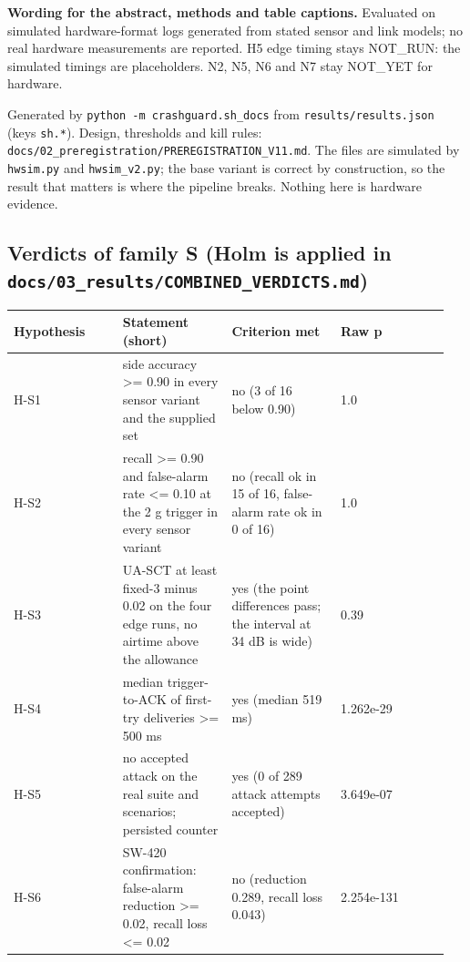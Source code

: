


\textbf{Wording for the abstract, methods and table captions.} Evaluated on simulated hardware-format logs generated from stated sensor and link models; no real hardware measurements are reported. H5 edge timing stays NOT\_RUN: the simulated timings are placeholders. N2, N5, N6 and N7 stay NOT\_YET for hardware.

Generated by \texttt{python -m crashguard.sh\_docs} from \texttt{results/results.json} (keys \texttt{sh.*}). Design, thresholds and kill rules: \texttt{docs/02\_preregistration/PREREGISTRATION\_V11.md}. The files are simulated by \texttt{hwsim.py} and \texttt{hwsim\_v2.py}; the base variant is correct by construction, so the result that matters is where the pipeline breaks. Nothing here is hardware evidence.

\subsection*{Verdicts of family S (Holm is applied in \texttt{docs/03\_results/COMBINED\_VERDICTS.md})}

{\scriptsize\raggedright
\begin{longtable}{p{0.237\linewidth}p{0.237\linewidth}p{0.237\linewidth}p{0.237\linewidth}}
\toprule
Hypothesis & Statement (short) & Criterion met & Raw p \\
\midrule
\endhead
H-S1 & side accuracy >= 0.90 in every sensor variant and the supplied set & no (3 of 16 below 0.90) & 1.0 \\
H-S2 & recall >= 0.90 and false-alarm rate <= 0.10 at the 2 g trigger in every sensor variant & no (recall ok in 15 of 16, false-alarm rate ok in 0 of 16) & 1.0 \\
H-S3 & UA-SCT at least fixed-3 minus 0.02 on the four edge runs, no airtime above the allowance & yes (the point differences pass; the interval at 34 dB is wide) & 0.39 \\
H-S4 & median trigger-to-ACK of first-try deliveries >= 500 ms & yes (median 519 ms) & 1.262e-29 \\
H-S5 & no accepted attack on the real suite and scenarios; persisted counter & yes (0 of 289 attack attempts accepted) & 3.649e-07 \\
H-S6 & SW-420 confirmation: false-alarm reduction >= 0.02, recall loss <= 0.02 & no (reduction 0.289, recall loss 0.043) & 2.254e-131 \\
\bottomrule
\end{longtable}}


